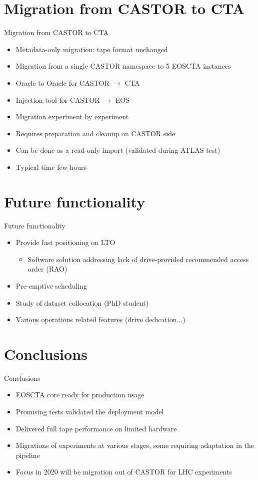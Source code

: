 \documentclass[aspectratio=169]{beamer}
\begin{document}
\section{Migration from CASTOR to CTA}
\begin{frame}{Migration from CASTOR to CTA}
  \begin{itemize}
    \item Metadata-only migration: tape format unchanged
    \item Migration from a single CASTOR namespace to 5 EOSCTA instances
    \item Oracle to Oracle for CASTOR $\rightarrow$ CTA
    \item Injection tool for CASTOR $\rightarrow$ EOS
    \item Migration experiment by experiment
    \item Requires preparation and cleanup on CASTOR side
    \item Can be done as a read-only import (validated during ATLAS test)
    \item Typical time few hours
  \end{itemize}
\end{frame}

\section{Future functionality}
\begin{frame}{Future functionality}
  \begin{itemize}
    \item Provide fast positioning on LTO
    \begin{itemize}
      \item Software solution addressing lack of drive-provided recommended access order (RAO)
    \end{itemize}
    \item Pre-emptive scheduling
    \item Study of dataset collocation (PhD student)
    \item Various operations related features (drive dedication...)
  \end{itemize}
\end{frame}


\section{Conclusions}
\begin{frame}{Conclusions}
  \begin{itemize}
    \item EOSCTA core ready for production usage
    \item Promising tests validated the deployment model
    \item Delivered full tape performance on limited hardware
    \item Migrations of experiments at various stages, some requiring adaptation in the pipeline
    \item Focus in 2020 will be migration out of CASTOR for LHC experiments
  \end{itemize}

\end{frame}
\backcover
\end{document}

